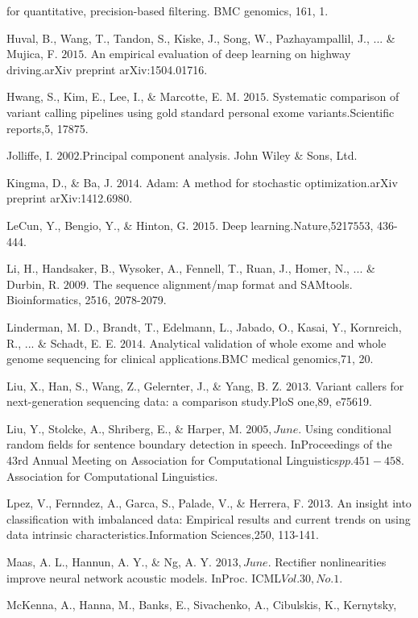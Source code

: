 \documentclass{article}
\begin{document}
\begin{list}{}{%
\setlength{\topsep}{0pt}%
\setlength{\leftmargin}{0.5in}%
\setlength{\listparindent}{-0.5in}%
\setlength{\itemindent}{-0.5in}%
\setlength{\parsep}{\parskip}%
}
for quantitative, precision-based filtering. BMC genomics, 16\(1\), 1.\\\item[] Huval, B., Wang, T., Tandon, S., Kiske, J., Song, W., Pazhayampallil, J., ... \& Mujica, F. \(2015\). An empirical evaluation of deep learning on highway driving.arXiv preprint arXiv:1504.01716.\\\item[] Hwang, S., Kim, E., Lee, I., \& Marcotte, E. M. \(2015\). Systematic comparison of variant calling pipelines using gold standard personal exome variants.Scientific reports,5, 17875.\\\item[] Jolliffe, I. \(2002\).Principal component analysis. John Wiley \& Sons, Ltd.\\\item[] Kingma, D., \& Ba, J. \(2014\). Adam: A method for stochastic optimization.arXiv preprint arXiv:1412.6980.\\\item[] LeCun, Y., Bengio, Y., \& Hinton, G. \(2015\). Deep learning.Nature,521\(7553\), 436-444.\\\item[] Li, H., Handsaker, B., Wysoker, A., Fennell, T., Ruan, J., Homer, N., ... \& Durbin, R. \(2009\). The sequence alignment/map format and SAMtools. Bioinformatics, 25\(16\), 2078-2079.\\\item[] Linderman, M. D., Brandt, T., Edelmann, L., Jabado, O., Kasai, Y., Kornreich, R., ... \& Schadt, E. E. \(2014\). Analytical validation of whole exome and whole genome sequencing for clinical applications.BMC medical genomics,7\(1\), 20.\\\item[] Liu, X., Han, S., Wang, Z., Gelernter, J., \& Yang, B. Z. \(2013\). Variant callers for next-generation sequencing data: a comparison study.PloS one,8\(9\), e75619.\\\item[] Liu, Y., Stolcke, A., Shriberg, E., \& Harper, M. \(2005, June\). Using conditional random fields for sentence boundary detection in speech. InProceedings of the 43rd Annual Meeting on Association for Computational Linguistics\(pp. 451-458\). Association for Computational Linguistics.\\\item[] Lpez, V., Fernndez, A., Garca, S., Palade, V., \& Herrera, F. \(2013\). An insight into classification with imbalanced data: Empirical results and current trends on using data intrinsic characteristics.Information Sciences,250, 113-141.\\\item[] Maas, A. L., Hannun, A. Y., \& Ng, A. Y. \(2013, June\). Rectifier nonlinearities improve neural network acoustic models. InProc. ICML\(Vol. 30, No. 1\).\\\item[] McKenna, A., Hanna, M., Banks, E., Sivachenko, A., Cibulskis, K., Kernytsky, 
\end{list}
\end{document}
